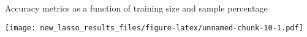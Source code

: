 \documentclass[
]{article}
\newenvironment{Shaded}{\begin{snugshade}}{\end{snugshade}}
\newcommand{\CommentTok}[1]{\textcolor[rgb]{0.56,0.35,0.01}{\textit{#1}}}
\newcommand{\DataTypeTok}[1]{\textcolor[rgb]{0.13,0.29,0.53}{#1}}
\newcommand{\KeywordTok}[1]{\textcolor[rgb]{0.13,0.29,0.53}{\textbf{#1}}}
\newcommand{\NormalTok}[1]{#1}
\newcommand{\OperatorTok}[1]{\textcolor[rgb]{0.81,0.36,0.00}{\textbf{#1}}}
\newcommand{\StringTok}[1]{\textcolor[rgb]{0.31,0.60,0.02}{#1}}
\begin{document}
Accuracy metrics as a function of training size and sample percentage

\begin{Shaded}
\end{Shaded}

\texttt{[image: new\_lasso\_results\_files/figure-latex/unnamed-chunk-10-1.pdf]}

\begin{Shaded}
\end{Shaded}
\end{document}
